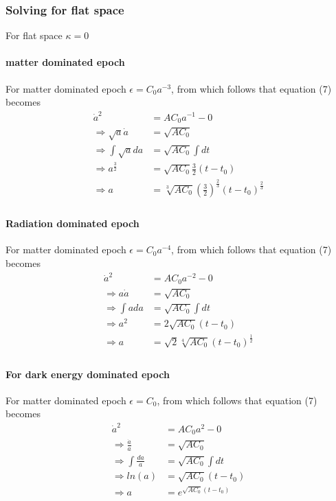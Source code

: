 \documentclass[a4paper, 11pt]{FSKH_623_Report}
\numberwithin{equation}{section}
\newcommand{\brac}[1]{\left(#1\right)}
\begin{document}
\subsubsection*{Solving for flat space}
For flat space $\kappa=0$
\paragraph*{matter dominated epoch}
For matter dominated epoch $\epsilon=C_{0}a^{-3}$, from which follows that equation (7) becomes
\begin{equation}
\begin{split}
\dot{a}^{2} &= AC_{0}a^{-1}-0\\
\Rightarrow \sqrt{a}\dot{a} &= \sqrt{AC_{0}}\\
\Rightarrow \int \sqrt{a}da &= \sqrt{AC_{0}}\int dt\\
\Rightarrow a^{\frac{3}{2}} &= \sqrt{AC_{0}}\frac{3}{2}\brac{t-t_{0}}\\
\Rightarrow a &= \sqrt[3]{AC_{0}}\brac{\frac{3}{2}}^\frac{2}{3}\brac{t-t_{0}}^{\frac{2}{3}}\\
\end{split}
\end{equation}
\paragraph*{Radiation dominated epoch}
For matter dominated epoch $\epsilon=C_{0}a^{-4}$, from which follows that equation (7) becomes
\begin{equation}
\begin{split}
\dot{a}^{2} &= AC_{0}a^{-2}-0\\
\Rightarrow a\dot{a} &= \sqrt{AC_{0}}\\
\Rightarrow \int ada &= \sqrt{AC_{0}}\int dt\\
\Rightarrow a^{2} &= 2\sqrt{AC_{0}}\brac{t-t_{0}}\\
\Rightarrow a &= \sqrt{2}\sqrt[4]{AC_{0}}\brac{t-t_{0}}^{\frac{1}{2}}\\
\end{split}
\end{equation}
\paragraph*{For dark energy dominated epoch}
For matter dominated epoch $\epsilon=C_{0}$, from which follows that equation (7) becomes
\begin{equation}
\begin{split}
\dot{a}^{2} &= AC_{0}a^{2}-0\\
\Rightarrow \frac{\dot{a}}{a} &= \sqrt{AC_{0}}\\
\Rightarrow \int \frac{da}{a} &= \sqrt{AC_{0}}\int dt\\
\Rightarrow ln\brac{a} &= \sqrt{AC_{0}}\brac{t-t_{0}}\\
\Rightarrow a &= e^{\sqrt{AC_{0}}\brac{t-t_{0}}}\\
\end{split}
\end{equation}
\end{document}
